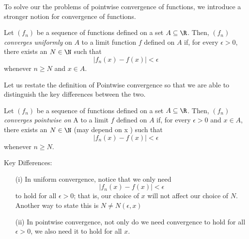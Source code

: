 To solve our the problems of pointwise convergence of functions, we introduce a stronger notion for convergence of functions.

\begin{tcolorbox}
    \begin{defn}
    Let \( (f_n)  \) be a sequence of functions defined on a set \( A \subseteq \R  \). Then, \( (f_n)  \) \textit{converges uniformly} on \( A  \) to a limit function \( f  \) defined on \( A  \) if, for every \( \epsilon  > 0 \), there exists an \( N \in \N  \) such that 
    \[  | f_n(x) - f(x)  | < \epsilon   \]
    whenever \( n \geq N  \) and \( x \in A  \).
    \end{defn}
\end{tcolorbox}

Let us restate the definition of Pointwise convergence so that we are able to distinguish the key differences between the two.

\begin{tcolorbox}
    \begin{defn}
    Let \( (f_n)  \) be a sequence of functions defined on a set \( A \subseteq \R  \). Then, \( (f_n)  \) \textit{converges pointwise on} A to a limit \( f  \) defined on \( A  \) if, for every \( \epsilon > 0   \) and \( x \in A  \), there exists an \( N \in \N  \) (may depend on x ) such that 
    \[  | f_n(x) - f(x)  | < \epsilon  \] whenever \( n \geq N  \).
    \end{defn}
\end{tcolorbox}

Key Differences:
\begin{enumerate}
    \item[(i)] In uniform convergence, notice that we only need 
        \[ | f_n(x) - f(x)  | < \epsilon  \] to hold for all \( \epsilon > 0  \); that is, our choice of \( x    \) will not affect our choice of \( N  \). Another way to state this is \( N \neq N(\epsilon, x ) \)
    \item[(ii)] In pointwise convergence, not only do we need convergence to hold for all \( \epsilon > 0   \), we also need it to hold for all \( x  \).
\end{enumerate}

